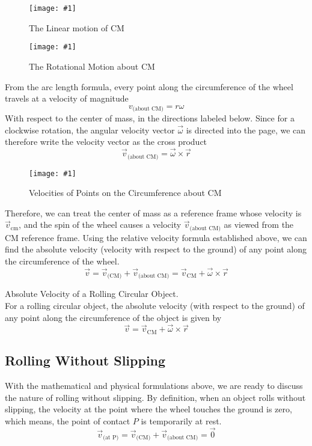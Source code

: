 \documentclass[11pt]{article}
\newcommand{\fig}[4]{
    \begin{figure}[H]
        \centering
        \texttt{[image: \#1]}
        \caption{#2}
        \label{exp4fit}
    \end{figure}
}
\theoremstyle{gangnamstyle}{\newtheorem{definition}{Definition}[]}
\theoremstyle{gangnamstyle}{\newtheorem{example}{Example}[]}
\theoremstyle{gangnamstyle}{\newtheorem{problem}{Problem}[]}
\theoremstyle{gangnamstyle}{\newtheorem{warning}{Warning}[]}
\begin{document}
\fig{figs/n8/linear.png}{The Linear motion of CM}{0.45}{0}

\fig{figs/n8/rot.png}{The Rotational Motion about CM}{0.45}{0}

\pagebreak

From the arc length formula, every point along the circumference of the wheel travels at a velocity of magnitude 
\[ v_{\text{(about CM)}} = r\omega \]
With respect to the center of mass, in the directions labeled below. Since for a clockwise rotation, the angular velocity vector $\Vec{\omega}$ is directed into the page, we can therefore write the velocity vector as the cross product
\[ \Vec{v}_{\text{(about CM)}} = \Vec{\omega} \times \Vec{r} \]

\fig{figs/n8/about.jpeg}{Velocities of Points on the Circumference about CM}{0.125}{0}

Therefore, we can treat the center of mass as a reference frame whose velocity is $\Vec{v}_{\text{cm}}$, and the spin of the wheel causes a velocity $\Vec{v}_{\text{(about CM)}}$ as viewed from the CM reference frame. Using the relative velocity formula established above, we can find the absolute velocity (velocity with respect to the ground) of any point along the circumference of the wheel. 
\[ \Vec{v} = \Vec{v}_{\text{(CM)}} + \Vec{v}_{\text{(about CM)}} = \Vec{v}_{\text{CM}} + \Vec{\omega} \times \Vec{r} \]

\begin{definition}
Absolute Velocity of a Rolling Circular Object. \\
For a rolling circular object, the absolute velocity (with respect to the ground) of any point along the circumference of the object is given by
\begin{equation}
\Vec{v} = \Vec{v}_{\text{CM}} + \Vec{\omega} \times \Vec{r}
\end{equation}
\end{definition}

\subsection{Rolling Without Slipping}

With the mathematical and physical formulations above, we are ready to discuss the nature of rolling without slipping. By definition, when an object rolls without slipping, the velocity at the point where the wheel touches the ground is zero, which means, the point of contact $P$ is temporarily at rest. 
\[ \Vec{v}_{\text{(at P)}} = \Vec{v}_{\text{(CM)}} + \Vec{v}_{\text{(about CM)}} = \Vec{0} \]
\end{document}
